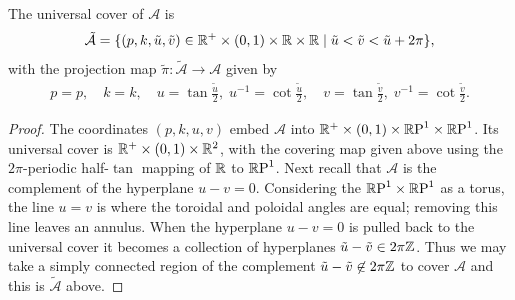 \documentclass{article}
\begin{document}
\begin{lem}\label{lem:mathcal tilde C}
The universal cover of $\mathcal{A}$ is
\[
\mathcal{\tilde{A}} =
\{(p, k,\tilde{u},\tilde{v}) \in \mathbb{R}^+\times(0,1)\times\mathbb{R}\times\mathbb{R} \mid  \tilde{u} < \tilde{v} < \tilde{u} + 2\pi \},
\]
with the projection map $\tilde{\pi} : \mathcal{\tilde{A}} \to \mathcal{A}$ given by
\begin{align*}
p = p,\quad 
k = k,\quad
u = \tan \frac{\tilde{u}}{2},\;
u^{-1} = \cot \frac{\tilde{u}}{2},\quad
v = \tan \frac{\tilde{v}}{2},\;
v^{-1} = \cot \frac{\tilde{v}}{2}.
\end{align*}

\begin{proof}
The coordinates $(p,k,u,v)$ embed $\mathcal{A}$ into $\mathbb{R}^+\times(0,1)\times \mathbb{R}\text{P}^1 \times \mathbb{R}\text{P}^1$. Its universal cover is $\mathbb{R}^+\times(0,1)\times\mathbb{R}^2$, with the covering map given above using the $2\pi$-periodic half-$\tan$ mapping of $\mathbb{R}$ to $\mathbb{R}\text{P}^1$. Next recall that $\mathcal{A}$ is the complement of the hyperplane $u-v = 0$.
Considering the $\mathbb{R}\text{P}^1\times\mathbb{R}\text{P}^1$ as a torus, the line $u=v$ is where the toroidal and poloidal angles are equal; removing this line leaves an annulus.
When the hyperplane $u-v=0$ is pulled back to the universal cover it becomes a collection of hyperplanes $\tilde{u}-\tilde{v} \in 2\pi\mathbb{Z}$. Thus we may take a simply connected region of the complement $\tilde{u}-\tilde{v} \not\in 2\pi\mathbb{Z}$ to cover $\mathcal{A}$ and this is $\mathcal{\tilde{A}}$ above.
\end{proof}
\end{lem}
\end{document}
